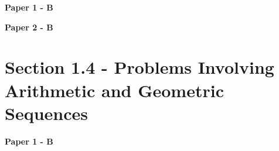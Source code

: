 \documentclass[12pt, a4paper]{article}
\begin{document}
\textbf{Paper 1 - B}
\begin{enumx}[label=\arabic*.,start=7]
\item {}\label{DSE2018-CoreP1-Q16} 
\item {}\label{DSE2019-CoreP1-Q16} 
\item {}\label{DSE2020-CoreP1-Q16} 
\end{enumx}
\textbf{Paper 2 - B}
\begin{enumx}[label=\arabic*.,start=10]
\item {}\label{DSE2014-CoreP2-Q37} 
\item {}\label{DSE2015-CoreP2-Q37} 
\item {}\label{DSE2019-CoreP2-Q36} 
\item {}\label{DSE2021-CoreP2-Q36} 
\item {}\label{DSE2022-CoreP2-Q37} 
\end{enumx}




\section*{Section 1.4 - Problems Involving  Arithmetic and Geometric  Sequences \NF}\label{section:6-1-4}

\textbf{Paper 1 - B}
\begin{enumx}[label=\arabic*.,start=15]
\item {}\label{DSE2013-CoreP1-Q19} 
\item {}\label{DSE2016-CoreP1-Q17} 
\item {}\label{DSE2023-CoreP1-Q18} 
\end{enumx}
\end{document}
